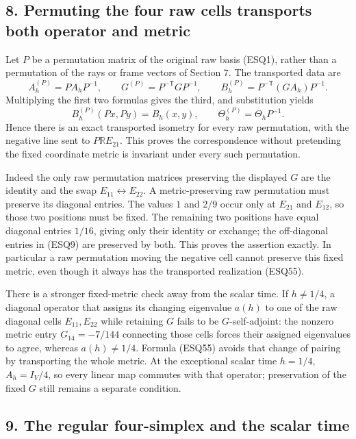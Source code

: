 \documentclass[
  10pt,
  a4paper,
]{article}
\begin{document}
\subsection{8. Permuting the four raw cells transports both operator and
metric}\label{permuting-the-four-raw-cells-transports-both-operator-and-metric}

Let \(P\) be a permutation matrix of the original raw basis (ESQ1),
rather than a permutation of the rays or frame vectors of Section 7. The
transported data are \[
A_h^{(P)}=PA_hP^{-1},\qquad
G^{(P)}=P^{-\mathsf T}GP^{-1},\qquad
B_h^{(P)}=P^{-\mathsf T}(GA_h)P^{-1}.
\tag{ESQ55}
\] Multiplying the first two formulas gives the third, and substitution
yields \[
B_h^{(P)}(Px,Py)=B_h(x,y),\qquad
\Theta_h^{(P)}=\Theta_hP^{-1}.
\tag{ESQ56}
\] Hence there is an exact transported isometry for every raw
permutation, with the negative line sent to \(P\mathbb RE_{21}\). This
proves the correspondence without pretending the fixed coordinate metric
is invariant under every such permutation.

Indeed the only raw permutation matrices preserving the displayed \(G\)
are the identity and the swap \(E_{11}\leftrightarrow E_{22}\). A
metric-preserving raw permutation must preserve its diagonal entries.
The values \(1\) and \(2/9\) occur only at \(E_{21}\) and \(E_{12}\), so
those two positions must be fixed. The remaining two positions have
equal diagonal entries \(1/16\), giving only their identity or exchange;
the off-diagonal entries in (ESQ9) are preserved by both. This proves
the assertion exactly. In particular a raw permutation moving the
negative cell cannot preserve this fixed metric, even though it always
has the transported realization (ESQ55).

There is a stronger fixed-metric check away from the scalar time. If
\(h\ne1/4\), a diagonal operator that assigns its changing eigenvalue
\(a(h)\) to one of the raw diagonal cells \(E_{11},E_{22}\) while
retaining \(G\) fails to be \(G\)-self-adjoint: the nonzero metric entry
\(G_{14}=-7/144\) connecting those cells forces their assigned
eigenvalues to agree, whereas \(a(h)\ne1/4\). Formula (ESQ55) avoids
that change of pairing by transporting the whole metric. At the
exceptional scalar time \(h=1/4\), \(A_h=I_V/4\), so every linear map
commutes with that operator; preservation of the fixed \(G\) still
remains a separate condition.

\subsection{9. The regular four-simplex and the scalar
time}\label{the-regular-four-simplex-and-the-scalar-time}
\end{document}
